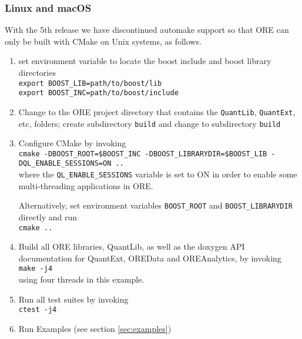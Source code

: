 \subsubsection*{Linux and macOS}

With the 5th release we have discontinued automake support so that ORE can only be built with CMake on Unix systems, as follows.

\begin{enumerate}
\item set environment variable to locate the boost include and boost library directories\\
\medskip
  {\tt export BOOST\_LIB=path/to/boost/lib}\\
  {\tt export BOOST\_INC=path/to/boost/include}
\medskip
\item Change to the ORE project directory that contains the {\tt QuantLib}, {\tt QuantExt}, etc, folders; create subdirectory {\tt build} and change to subdirectory {\tt build}
\item Configure CMake by invoking \\
\medskip
{\tt cmake -DBOOST\_ROOT=\${BOOST\_INC} -DBOOST\_LIBRARYDIR=\${BOOST\_LIB} -DQL\_ENABLE\_SESSIONS=ON ..} \\
\medskip
where the {\tt QL\_ENABLE\_SESSIONS} variable is set to ON in order to enable some multi-threading applications in ORE.

Alternatively, set environment variables {\tt BOOST\_ROOT} and {\tt BOOST\_LIBRARYDIR} directly and run \\
\medskip
{\tt cmake ..} \\
\medskip
\item Build all ORE libraries, QuantLib, as well as the doxygen API documentation for QuantExt, OREData and OREAnalytics, by invoking \\
\medskip
{\tt make -j4} \\
\medskip
using four threads in this example.
\medskip
\item Run all test suites by invoking \\
\medskip
{\tt ctest -j4}
\item Run Examples (see section \ref{sec:examples})
\end{enumerate}

